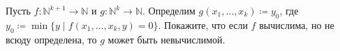 Пусть $f\colon \mathbb{N}^{k + 1} \to \mathbb{N}$ и $g\colon \mathbb{N}^k \to \mathbb{N}$. Определим
$g(x_1, \dots, x_k) \coloneqq y_0$, где $y_0 \coloneqq \min \{y \mid f(x_1, \dots, x_k, y) =
0\}$. Покажите, что если $f$ вычислима, но не всюду определена, то $g$ может быть невычислимой.
